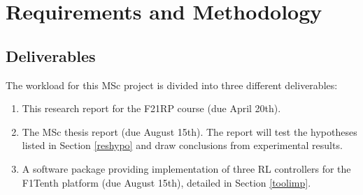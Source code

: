 
\chapter{Requirements and Methodology} %

\label{Chapter3} %



\section{Deliverables}
\label{deliv}

The workload for this MSc project is divided into three different deliverables:

\begin{enumerate}
	\item This research report for the F21RP course (due April 20th).
	\item The MSc thesis report (due August 15th). The report will test the hypotheses listed in Section \ref{reshypo} and draw conclusions from experimental results.
	\item A software package providing implementation of three RL controllers for the F1Tenth platform (due August 15th), detailed in Section \ref{toolimp}.
\end{enumerate}

